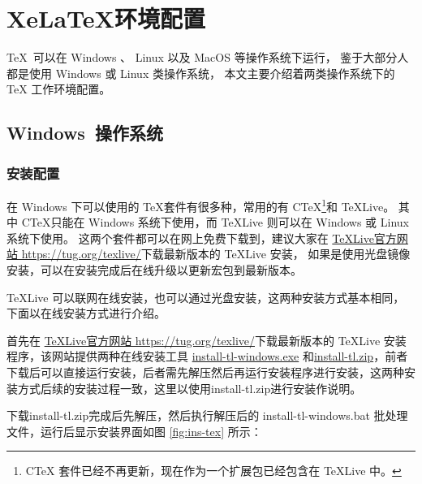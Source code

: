 
%
%
%

\chapter{XeLaTeX环境配置}
\label{chap02}

\TeX{}~可以在 Windows 、 Linux 以及 MacOS 等操作系统下运行，
鉴于大部分人都是使用 Windows 或 Linux 类操作系统，
本文主要介绍着两类操作系统下的 \TeX{} 工作环境配置。

\section{Windows~操作系统}

\subsection{安装配置}
在 Windows 下可以使用的 \TeX{}套件有很多种，常用的有 C\TeX{}\footnote{C\TeX{} 套件已经不再更新，现在作为一个扩展包已经包含在 \TeX{}Live 中。}和 \TeX{}Live。
其中 C\TeX{}只能在 Windows 系统下使用，而 \TeX{}Live 则可以在 Windows 或 Linux 系统下使用。
这两个套件都可以在网上免费下载到，建议大家在 \href{https://tug.org/texlive/}{\TeX{}Live官方网站 https://tug.org/texlive/}下载最新版本的 \TeX{}Live 安装，
如果是使用光盘镜像安装，可以在安装完成后在线升级以更新宏包到最新版本。

\TeX{}Live 可以联网在线安装，也可以通过光盘安装，这两种安装方式基本相同，下面以在线安装方式进行介绍。

首先在 \href{https://tug.org/texlive/}{\TeX{}Live官方网站 https://tug.org/texlive/}下载最新版本的 \TeX{}Live 安装程序，该网站提供两种在线安装工具 \href{https://mirror.ctan.org/systems/texlive/tlnet/install-tl-windows.exe}{install-tl-windows.exe} 和\href{https://mirror.ctan.org/systems/texlive/tlnet/install-tl.zip}{install-tl.zip}，前者下载后可以直接运行安装，后者需先解压然后再运行安装程序进行安装，这两种安装方式后续的安装过程一致，这里以使用install-tl.zip进行安装作说明。

下载install-tl.zip完成后先解压，然后执行解压后的 install-tl-windows.bat 批处理文件，运行后显示安装界面如图 \ref{fig:ins-tex} 所示：

